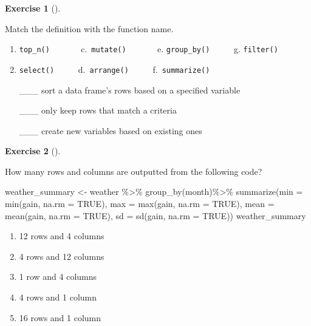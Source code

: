 \documentclass[
  letterpaper,
  DIV=11,
  numbers=noendperiod]{scrreprt}
\newenvironment{Shaded}{\begin{snugshade}}{\end{snugshade}}
\newcommand{\AttributeTok}[1]{\textcolor[rgb]{0.40,0.45,0.13}{#1}}
\newcommand{\ConstantTok}[1]{\textcolor[rgb]{0.56,0.35,0.01}{#1}}
\newcommand{\FunctionTok}[1]{\textcolor[rgb]{0.28,0.35,0.67}{#1}}
\newcommand{\NormalTok}[1]{\textcolor[rgb]{0.00,0.23,0.31}{#1}}
\newcommand{\OtherTok}[1]{\textcolor[rgb]{0.00,0.23,0.31}{#1}}
\newcommand{\SpecialCharTok}[1]{\textcolor[rgb]{0.37,0.37,0.37}{#1}}
\providecommand{\tightlist}{%
  \setlength{\itemsep}{0pt}\setlength{\parskip}{0pt}}\usepackage{longtable,booktabs,array}
\theoremstyle{definition}
\newtheorem{exercise}{Exercise}[chapter]
\theoremstyle{remark}
\begin{document}
\leavevmode{}%
\begin{exercise}[]\label{exr-ch03-c02}

Match the definition with the function name.

\begin{enumerate}
\def\labelenumi{\alph{enumi})}
\item
  \texttt{top\_n()} ~ ~ ~ ~ c.~\texttt{mutate()} ~ ~ ~ ~ e.
  \texttt{group\_by()} ~ ~ ~ g. \texttt{filter()}
\item
  \texttt{select()} ~ ~ ~ d.~\texttt{arrange()} ~ ~ ~
  f.~\texttt{summarize()}

  \_\_\_ sort a data frame's rows based on a specified variable

  \_\_\_ only keep rows that match a criteria

  \_\_\_ create new variables based on existing ones
\end{enumerate}

\end{exercise}

\leavevmode{}%
\begin{exercise}[]\label{exr-ch03-c03}

How many rows and columns are outputted from the following code?

\begin{Shaded}
\begin{Highlighting}[]
\NormalTok{weather\_summary }\OtherTok{\textless{}{-}}\NormalTok{ weather }\SpecialCharTok{\%\textgreater{}\%}  
    \FunctionTok{group\_by}\NormalTok{(month)}\SpecialCharTok{\%\textgreater{}\%} 
    \FunctionTok{summarize}\NormalTok{(}\AttributeTok{min =} \FunctionTok{min}\NormalTok{(gain, }\AttributeTok{na.rm =} \ConstantTok{TRUE}\NormalTok{), }
            \AttributeTok{max =} \FunctionTok{max}\NormalTok{(gain, }\AttributeTok{na.rm =} \ConstantTok{TRUE}\NormalTok{),}
            \AttributeTok{mean =} \FunctionTok{mean}\NormalTok{(gain, }\AttributeTok{na.rm =} \ConstantTok{TRUE}\NormalTok{),  }
            \AttributeTok{sd =} \FunctionTok{sd}\NormalTok{(gain, }\AttributeTok{na.rm =} \ConstantTok{TRUE}\NormalTok{))}
\NormalTok{weather\_summary}
\end{Highlighting}
\end{Shaded}

\begin{enumerate}
\def\labelenumi{\alph{enumi}.}
\tightlist
\item
  12 rows and 4 columns
\item
  4 rows and 12 columns
\item
  1 row and 4 columns
\item
  4 rows and 1 column
\item
  16 rows and 1 column
\end{enumerate}

\end{exercise}
\end{document}
